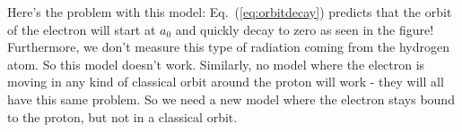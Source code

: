 Here's the problem with this model: Eq.~(\ref{eq:orbitdecay}) predicts that the orbit of the electron will start at $a_0$ and quickly decay to zero as seen in the figure! Furthermore, we don't measure this type of radiation coming from the hydrogen atom. So this model doesn't work. Similarly, no model where the electron is moving in any kind of classical orbit around the proton will work - they will all have this same problem. So we need a new model where the electron stays bound to the proton, but not in a classical orbit. \begin{marginfigure}\centering
{}
\end{marginfigure}

